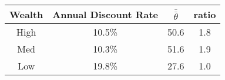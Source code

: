 \documentclass[border=1mm, preview]{standalone}
\begin{document}
\begin{tabular}{c|c|c|c}
\hline
Wealth & Annual Discount Rate & $\bar{\bar{\theta}}$ & ratio\\
\hline
\hline
High & 10.5\% & 50.6 & 1.8\\
\hline
Med & 10.3\% & 51.6 & 1.9\\
\hline
Low & 19.8\% & 27.6 & 1.0\\
\hline
\end{tabular}
\end{document}
